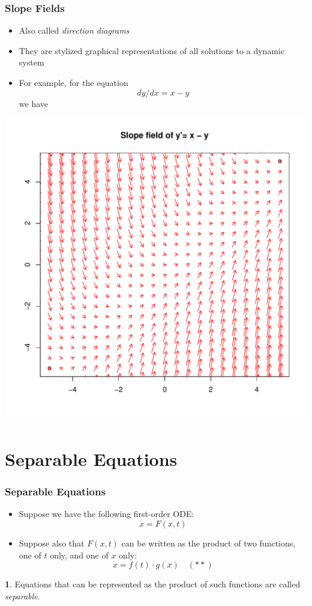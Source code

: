 \documentclass[10pt,usenames,dvipsnames]{beamer}
\theoremstyle{definition}
\newtheorem{definition}{\translate{Definition}}
\begin{document}
\begin{frame}[fragile]
\frametitle{Slope Fields}
\begin{itemize}
	\item Also called \textit{direction diagrams}
	\item They are stylized graphical representations of all solutions to a dynamic system
	\item For example, for the equation 
	\[
	 dy/dx = x - y 
	\]
	we have
\end{itemize}
\begin{center}
	\includegraphics[scale=0.3]{./graphs/fig1.pdf}
\end{center}

\end{frame}

\section{Separable Equations}
\begin{frame}[fragile]
\frametitle{Separable Equations}
\begin{itemize}
	\item Suppose we have the following first-order ODE:
	\[
		\dot{x} = F(x,t) 
	\]
	\item Suppose also that $F(x,t)$ can be written as the product of two functions, one of $t$ only, and one of $x$ only:
	\[
		\dot{x} = f(t)\cdot g(x)\quad (**)
	\]
\end{itemize}

\begin{definition}
	Equations that can be represented as the product of such functions are called \textit{separable}.
\end{definition}
\end{frame}
\end{document}
